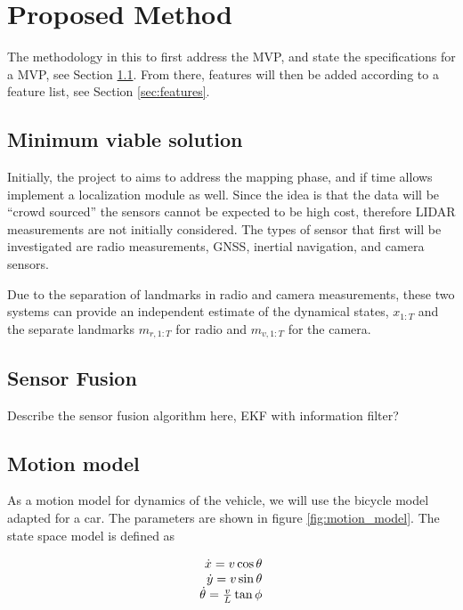 \section{Proposed Method}

The methodology in this to first address the \gls{MVP}, and state the
specifications for a \gls{MVP}, see Section \ref{sec:mvs}. From there, features
will then be added
according to a feature list, see Section \ref{sec:features}.

\subsection{Minimum viable solution}\label{sec:mvs}

Initially, the project to aims to address the mapping phase, and if time allows
implement a localization module as well. Since the idea is that the data will
be ``crowd sourced'' the sensors cannot be expected to be high cost, therefore
\gls{LIDAR} measurements are not initially considered. The types of sensor that
first will be investigated are radio measurements, \gls{GNSS}, inertial
navigation, and camera sensors.

Due to the separation of landmarks in radio and camera measurements, these two
systems can provide an independent estimate of the dynamical states, $x_{1:T}$
and the separate landmarks $m_{r,1:T}$ for radio and $m_{v,1:T}$ for the
camera.

\subsection{Sensor Fusion}

Describe the sensor fusion algorithm here, EKF with information filter?

\subsection{Motion model}

As a motion model for dynamics of the vehicle, we will use the bicycle model
adapted for a
car.
The parameters are shown in figure \ref{fig:motion_model}. The state space
model is defined as

\begin{equation}
 \begin{array}[b]{r}
  \dot{x}  = v \cos \theta \\
  \dot{y}  = v \sin \theta \\
  \dot{\theta}  = \frac{v}{L} \tan{\phi}
 \end{array}
\end{equation}

